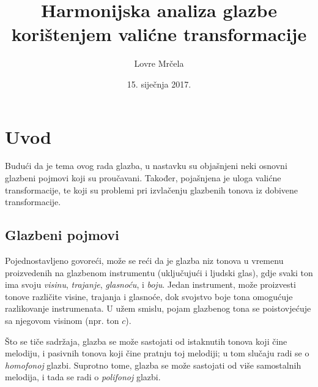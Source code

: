 \documentclass[a4paper, 11pt, twocolumn]{article}
\begin{document}
\date{15. siječnja 2017.}
\title{Harmonijska analiza glazbe korištenjem valićne transformacije} 
\author{Lovre Mrčela}
\maketitle



\section{Uvod}
Budući da je tema ovog rada glazba, u nastavku su objašnjeni neki osnovni glazbeni pojmovi koji su proučavani.
Također, pojašnjena je uloga valićne transformacije, te koji su problemi pri izvlačenju glazbenih tonova iz dobivene transformacije.

\subsection{Glazbeni pojmovi}
Pojednostavljeno govoreći, može se reći da je glazba niz tonova u vremenu proizvedenih na glazbenom instrumentu (uključujući i ljudski glas), gdje svaki ton ima svoju \textit{visinu}, \textit{trajanje}, \textit{glasnoću}, i \textit{boju}.
Jedan instrument, može proizvesti tonove različite visine, trajanja i glasnoće, dok svojstvo boje tona omogućuje razlikovanje instrumenata.
U užem smislu, pojam glazbenog tona se poistovjećuje sa njegovom visinom (npr. ton $c$).

Što se tiče sadržaja, glazba se može sastojati od istaknutih tonova koji čine melodiju, i pasivnih tonova koji čine pratnju toj melodiji; u tom slučaju radi se o \textit{homofonoj} glazbi.
Suprotno tome, glazba se može sastojati od više samostalnih melodija, i tada se radi o \textit{polifonoj} glazbi.
\end{document}
